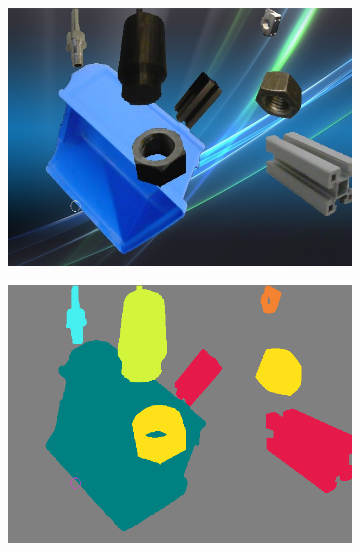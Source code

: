 \begin{figure}[h]
\begin{subfigure}{.24\textwidth}
			\includegraphics[width=1\linewidth]{images/sample_predictions/00132}
		\end{subfigure}
		\begin{subfigure}{.24\textwidth}
			\centering
			\includegraphics[width=1\linewidth]{images/sample_predictions/00132_shape_gt}
		\end{subfigure}
		\begin{subfigure}{.24\textwidth}
			\centering

\end{subfigure}
\end{figure}
